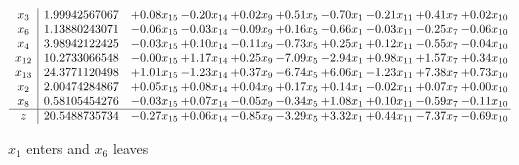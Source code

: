 \documentclass[9pt]{article}
\begin{document}
 \[\begin{array}{c| c c@{\hskip 2pt} c@{\hskip 2pt} c@{\hskip 2pt} c@{\hskip 2pt} c@{\hskip 2pt} c@{\hskip 2pt} c@{\hskip 2pt} c@{\hskip 2pt} }
 x_{3}   &  1.99942567067 & +  0.08 x_{15} & -0.20 x_{14} & +  0.02 x_{9} & +  0.51 x_{5} & -0.70 x_{1} & -0.21 x_{11} & +  0.41 x_{7} & +  0.02 x_{10}\\
 x_{6}   &  1.13880243071 & -0.06 x_{15} & -0.03 x_{14} & -0.09 x_{9} & +  0.16 x_{5} & -0.66 x_{1} & -0.03 x_{11} & -0.25 x_{7} & -0.06 x_{10}\\
 x_{4}   &  3.98942122425 & -0.03 x_{15} & +  0.10 x_{14} & -0.11 x_{9} & -0.73 x_{5} & +  0.25 x_{1} & +  0.12 x_{11} & -0.55 x_{7} & -0.04 x_{10}\\
 x_{12}   &  10.2733066548 & -0.00 x_{15} & +  1.17 x_{14} & +  0.25 x_{9} & -7.09 x_{5} & -2.94 x_{1} & +  0.98 x_{11} & +  1.57 x_{7} & +  0.34 x_{10}\\
 x_{13}   &  24.3771120498 & +  1.01 x_{15} & -1.23 x_{14} & +  0.37 x_{9} & -6.74 x_{5} & +  6.06 x_{1} & -1.23 x_{11} & +  7.38 x_{7} & +  0.73 x_{10}\\
 x_{2}   &  2.00474284867 & +  0.05 x_{15} & +  0.08 x_{14} & +  0.04 x_{9} & +  0.17 x_{5} & +  0.14 x_{1} & -0.02 x_{11} & +  0.07 x_{7} & +  0.00 x_{10}\\
 x_{8}   &  0.58105454276 & -0.03 x_{15} & +  0.07 x_{14} & -0.05 x_{9} & -0.34 x_{5} & +  1.08 x_{1} & +  0.10 x_{11} & -0.59 x_{7} & -0.11 x_{10}\\
\hline
z    &  20.5488735734 & -0.27 x_{15} & +  0.06 x_{14} & -0.85 x_{9} & -3.29 x_{5} & +  3.32 x_{1} & +  0.44 x_{11} & -7.37 x_{7} & -0.69 x_{10}\\
\end{array}\]


 $ x_{1} $ enters and $ x_{6} $ leaves 
\end{document}

